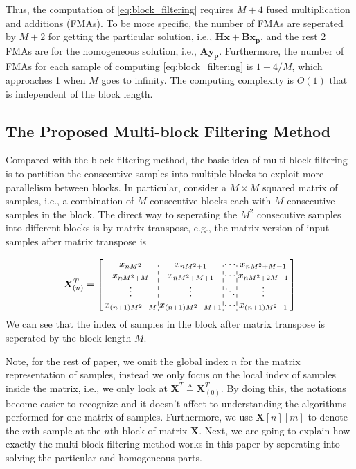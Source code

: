 Thus, the computation of \eqref{eq:block_filtering} requires $M+4$ fused multiplication and additions (FMAs).
To be more specific, the number of FMAs are seperated by $M{+}2$ for getting the particular solution, i.e.,
$\bm{H}\bm{x}+\bm{B}\bm{x_p}$, and the rest 2 FMAs are for the homogeneous solution, i.e., $\bm{Ay_p}$.
Furthermore, the number of FMAs for each sample of computing \eqref{eq:block_filtering} is $1{+}4/M$, which  
approaches 1 when $M$ goes to infinity. The computing complexity is $O(1)$ that is independent of the block length. 

\subsection{The Proposed Multi-block Filtering Method}

Compared with the block filtering method, the basic idea of multi-block filtering is to partition the consecutive samples into multiple blocks to exploit more
parallelism between blocks.
In particular, consider a $M \times M$ squared matrix of samples, i.e., a combination of $M$ consecutive blocks each with $M$ consecutive samples in the block.
The direct way to seperating the $M^2$ consecutive samples into different blocks is by matrix transpose,
e.g., the matrix version of input samples after matrix transpose is 

\begin{equation*}
    \begin{aligned}
    \bm{X}^T_{(n)} = \left[
        \arraycolsep=1.0pt\def\arraystretch{1.0}
        \begin{array}{c:c:c:c}
        x_{nM^2} & x_{nM^2+1} & \cdots & x_{nM^2+M-1} \\ 
        x_{nM^2+M} & x_{nM^2+M+1} & \cdots & x_{nM^2+2M-1} \\
        \vdots & \vdots & \ddots & \vdots \\
        x_{(n+1)M^2-M} & x_{(n+1)M^2-M+1} &\cdots & x_{(n+1)M^2-1} \\
        \end{array}\right]
    \end{aligned}
\end{equation*}
We can see that the index of samples in the block after matrix transpose is seperated by the block length $M$.

Note, for the rest of paper, we omit the global index $n$ for the matrix representation of samples,
instead we only focus on the local index of samples inside the matrix, i.e.,
we only look at $\bm{X}^T\triangleq\bm{X}^T_{(0)}$.
By doing this, the notations become easier to recognize and it doesn't affect to understanding
the algorithms performed for one matrix of samples. Furthermore, 
we use $\bm{X}[n][m]$ to denote the $m$th sample at the $n$th block
of matrix $\bm{X}$. Next, we are going to explain how exactly the multi-block filtering method works in this paper 
by seperating into solving the particular and homogeneous parts.

